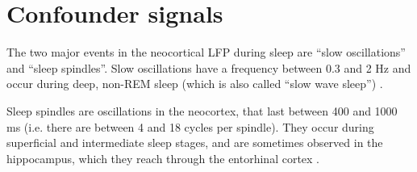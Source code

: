 
\section{Confounder signals}


The two major events in the neocortical LFP during sleep are ``slow oscillations'' and ``sleep spindles''. Slow oscillations have a frequency between 0.3 and 2 Hz and occur during deep, non-REM sleep (which is also called ``slow wave sleep'') \cite{Buzsaki2015,Bazhenov2006}.

Sleep spindles are  oscillations in the neocortex, that last between 400 and 1000 ms (i.e. there are between 4 and 18 cycles per spindle). They occur during superficial and intermediate sleep stages, and are sometimes observed in the hippocampus, which they reach through the entorhinal cortex \cite{Buzsaki2015,Bazhenov2006}.
%



